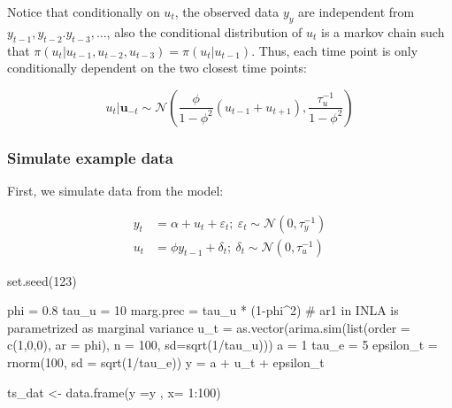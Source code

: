 \documentclass[
  letterpaper,
  DIV=11,
  numbers=noendperiod]{scrartcl}
\newenvironment{Shaded}{\begin{snugshade}}{\end{snugshade}}
\newcommand{\AttributeTok}[1]{\textcolor[rgb]{0.40,0.45,0.13}{#1}}
\newcommand{\CommentTok}[1]{\textcolor[rgb]{0.37,0.37,0.37}{#1}}
\newcommand{\DecValTok}[1]{\textcolor[rgb]{0.68,0.00,0.00}{#1}}
\newcommand{\FloatTok}[1]{\textcolor[rgb]{0.68,0.00,0.00}{#1}}
\newcommand{\FunctionTok}[1]{\textcolor[rgb]{0.28,0.35,0.67}{#1}}
\newcommand{\NormalTok}[1]{\textcolor[rgb]{0.00,0.23,0.31}{#1}}
\newcommand{\OtherTok}[1]{\textcolor[rgb]{0.00,0.23,0.31}{#1}}
\newcommand{\SpecialCharTok}[1]{\textcolor[rgb]{0.37,0.37,0.37}{#1}}
\begin{document}
Notice that conditionally on \(u_t\), the observed data \(y_y\) are
independent from\(y_{t-1},y_{t-2}.y_{t-3},\ldots\), also the conditional
distribution of \(u_t\) is a markov chain such that
\(\pi(u_t|u_{t-1},u_{t-2},u_{t-3}) = \pi(u_t|u_{t-1})\). Thus, each time
point is only conditionally dependent on the two closest time points:

\[
u_t|\mathbf{u}_{-t} \sim \mathcal{N}\left(\frac{\phi}{1-\phi^2}(u_{t-1}+u_{t+1}),\frac{\tau_u^{-1}}{1-\phi^2}\right)
\]

\subsubsection{Simulate example data}\label{simulate-example-data}

First, we simulate data from the model:

\[
\begin{aligned}
y_t &= \alpha + u_t + \varepsilon_t;~ \varepsilon_t \sim \mathcal{N}(0,\tau_y^{-1})\\
u_t &= \phi y_{t-1} + \delta_t; ~ \delta_t \sim \mathcal{N}(0,\tau_u^{-1})
\end{aligned}
\]

\begin{Shaded}
\begin{Highlighting}[]
\FunctionTok{set.seed}\NormalTok{(}\DecValTok{123}\NormalTok{)}

\NormalTok{phi }\OtherTok{=} \FloatTok{0.8}
\NormalTok{tau\_u }\OtherTok{=} \DecValTok{10}
\NormalTok{marg.prec }\OtherTok{=}\NormalTok{ tau\_u }\SpecialCharTok{*}\NormalTok{ (}\DecValTok{1}\SpecialCharTok{{-}}\NormalTok{phi}\SpecialCharTok{\^{}}\DecValTok{2}\NormalTok{) }\CommentTok{\# ar1 in INLA is parametrized as marginal variance}
\NormalTok{u\_t }\OtherTok{=}  \FunctionTok{as.vector}\NormalTok{(}\FunctionTok{arima.sim}\NormalTok{(}\FunctionTok{list}\NormalTok{(}\AttributeTok{order =} \FunctionTok{c}\NormalTok{(}\DecValTok{1}\NormalTok{,}\DecValTok{0}\NormalTok{,}\DecValTok{0}\NormalTok{), }\AttributeTok{ar =}\NormalTok{ phi), }
                          \AttributeTok{n =} \DecValTok{100}\NormalTok{,}
                          \AttributeTok{sd=}\FunctionTok{sqrt}\NormalTok{(}\DecValTok{1}\SpecialCharTok{/}\NormalTok{tau\_u)))}
\NormalTok{a }\OtherTok{=} \DecValTok{1}
\NormalTok{tau\_e }\OtherTok{=} \DecValTok{5}
\NormalTok{epsilon\_t }\OtherTok{=} \FunctionTok{rnorm}\NormalTok{(}\DecValTok{100}\NormalTok{, }\AttributeTok{sd =} \FunctionTok{sqrt}\NormalTok{(}\DecValTok{1}\SpecialCharTok{/}\NormalTok{tau\_e))}
\NormalTok{y }\OtherTok{=}\NormalTok{ a }\SpecialCharTok{+}\NormalTok{ u\_t }\SpecialCharTok{+}\NormalTok{ epsilon\_t}


\NormalTok{ts\_dat }\OtherTok{\textless{}{-}} \FunctionTok{data.frame}\NormalTok{(}\AttributeTok{y =}\NormalTok{y , }\AttributeTok{x=} \DecValTok{1}\SpecialCharTok{:}\DecValTok{100}\NormalTok{)}
\end{Highlighting}
\end{Shaded}
\end{document}
